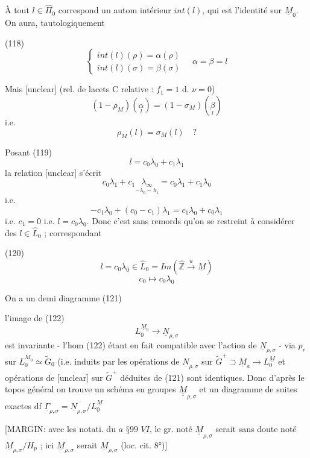 À tout $l \in \hat{\Pi}_0$ correspond un autom
intérieur $int(l)$, qui est l'identité sur
$\underline{M}_0$. On aura, tautologiquement

(118) $$ \begin{cases} int(l)(\rho) = \alpha(\rho) \\ int(l)(\sigma) = \beta(\sigma) \end{cases} \quad \alpha = \beta = l $$

Mais [unclear] (rel. de lacets C relative : $f_1=1$ d. $\nu=0$)
$$ (1-\rho_M)(\underset{l}{\alpha}) = (1-\sigma_M)(\underset{l}{\beta}) $$
i.e.
$$ \rho_M(l) = \sigma_M(l) \quad ? $$

Posant 
(119) $$ l = c_0 \lambda_0 + c_1 \lambda_1 $$
la relation [unclear] s'écrit
$$ c_0 \lambda_1 + c_1 \underset{-\lambda_0-\lambda_1}{\lambda_\infty} = c_0 \lambda_1 + c_1 \lambda_0 $$
i.e.
$$ - c_1 \lambda_0 + (c_0 - c_1) \lambda_1 = c_1 \lambda_0 + c_0 \lambda_1 $$
i.e. $c_1=0$ i.e. $l = c_0 \lambda_0$. Donc c'est
sans remords qu'on se restreint à
considérer des $l \in \widehat{L}_0$ ; correspondant

(120) $$ l = c_0 \lambda_0 \in \widehat{L}_0 = Im (\hat{\mathbb{Z}} \xrightarrow{u} \underline{M}) $$
$$ c_0 \mapsto c_0 \lambda_0 $$

On a un demi diagramme
(121) 

\newpage


l'image de
(122) $$L_0^{\underline{M}_0} \to \underline{N}_{\rho,\sigma}$$
est invariante - l'hom (122) étant en
fait compatible avec l'action de $\underline{N}_{\rho,\sigma}$
- via $p_r$ sur $L_0^{\underline{M}_0} \simeq \tilde{G}_0$ (i.e. induits
par les opérations de $\underline{N}_{\rho,\sigma}$ sur $\tilde{G}^+ \supset \underline{M}_a \to L_0^{\underline{M}}$
et opérations de [unclear] sur $\tilde{G}^+$ déduites
de (121) sont identiques. Donc d'après
le topos général on trouve un
schéma en groupes $\underline{\underline{M}}_{\rho,\sigma}$ et un
diagramme de suites exactes df $\underline{\Gamma}_{\rho,\sigma} = \underline{N}_{\rho,\sigma}/L_0^{\underline{M}}$

[MARGIN: avec les notati. du $a$ $§ 99$ $\underline{VI}$, le gr. noté $\underline{\underline{M}}_{\rho,\sigma}$ serait sans doute noté $\underline{M}_{\rho,\sigma}/H_p$ ; ici $\underline{M}_{\rho,\sigma}$ serait $\underline{M}_{\rho,\sigma}$ (loc. cit. 8°)]


